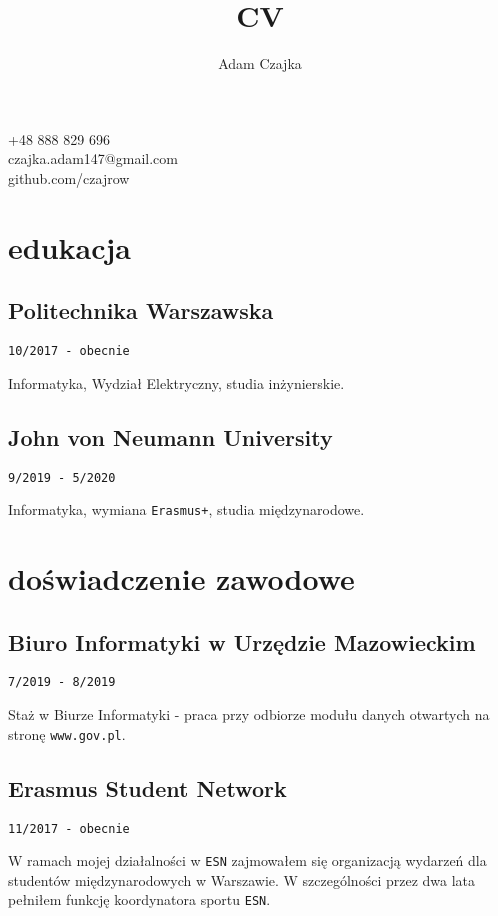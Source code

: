 \documentclass{article}
\makeatletter
\renewcommand{\maketitle}{
    \begin{center}



        {\huge\bfseries\theauthor}

        \vspace{.25em}

        +48 888 829 696\\czajka.adam147@gmail.com\\github.com/czajrow
	\end{center}
	\vspace{-.5cm}
}
\makeatother
\begin{document}
\title{CV}
\author{Adam Czajka}

\maketitle

\vspace{2em}

\begin{minipage}[t]{.5\textwidth}

	\section{edukacja}
	\subsection{Politechnika Warszawska}
	\texttt{10/2017 - obecnie}
	\par Informatyka, Wydział Elektryczny, studia inżynierskie.

	\subsection{John von Neumann University}
	\texttt{9/2019 - 5/2020}
	\par Informatyka, wymiana \texttt{Erasmus+}, studia międzynarodowe.

	\vspace{2em}

	\section{doświadczenie zawodowe}

	\subsection{Biuro Informatyki w Urzędzie Mazowieckim}
	\texttt{7/2019 - 8/2019}
	\par Staż w Biurze Informatyki - praca przy odbiorze modułu danych otwartych na stronę \texttt{www.gov.pl}.

	\subsection{Erasmus Student Network}
	\texttt{11/2017 - obecnie}
	\par W ramach mojej działalności w \texttt{ESN} zajmowałem się organizacją wydarzeń dla studentów międzynarodowych w Warszawie. W szczególności przez dwa lata pełniłem funkcję koordynatora sportu \texttt{ESN}.


\end{minipage}
\end{document}
